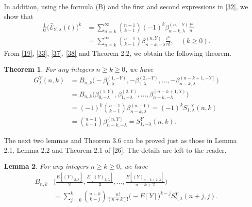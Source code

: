 \documentclass[a4paper,11pt]{amsart}
\newtheorem{theorem}{Theorem}[section]
\newtheorem{lemma}[theorem]{Lemma}
\begin{document}
In addition, using the formula (B) and the first and second expressions in \eqref{32}, we show that
\begin{equation} \label{38}
\begin{aligned}
\frac{1}{k!}\Big( \bar{\mathcal{E}}_{Y,\lambda}(t) \Big)^{k}&=\sum_{n=k}^{\infty}\binom{n-1}{k-1}(-1)^{k}\beta_{n-k,\lambda}^{(n,-Y)}\frac{t^{n}}{n!} \\
&=\sum_{n=k}^{\infty}\binom{n-1}{k-1}\beta_{n-k,-\lambda}^{(n,Y)}\frac{t^{n}}{n!},\quad (k \ge 0).
\end{aligned}
\end{equation}
From \eqref{19}, \eqref{33}, \eqref{37}, \eqref{38} and Theorem 2.2, we obtain the following theorem.
\begin{theorem}
For any integers $n \ge k \ge 0$, we have
\begin{align*}
G_{\lambda}^{Y}(n,k)&=B_{n,k}\big(-\beta_{0,\lambda}^{(1,-Y)},-\beta_{1,\lambda}^{(2,-Y)},\dots,-\beta_{n-k,\lambda}^{(n-k+1,-Y)}\big) \\
&=B_{n,k}\big(\beta_{0,-\lambda}^{(1,Y)},\beta_{1,-\lambda}^{(2,Y)},\dots,\beta_{n-k,-\lambda}^{(n-k+1,Y)}\big) \\
&=(-1)^{k}\binom{n-1}{k-1}\beta_{n-k,\lambda}^{(n,-Y)}=(-1)^{k}S_{1,\lambda}^{-Y}(n,k) \\
&=\binom{n-1}{k-1}\beta_{n-k,-\lambda}^{(n,Y)}=S_{1,-\lambda}^{Y}(n,k).
\end{align*}
\end{theorem}

The next two lemmas and Theorem 3.6 can be proved just as those in Lemma 2.1, Lemma 2.2 and Theorem 2.1 of [26]. The details are left to the reader.
\begin{lemma}
 For any integers $n \ge k \ge 0$, we have
\begin{align*}
B_{n,k}&\Big(\frac{E[(Y)_{2,\lambda}]}{2},\frac{E[(Y)_{3,\lambda}]}{3},\dots,\frac{E[(Y)_{n-k+2,\lambda}]}{n-k+2}\Big) \\
&=\sum_{j=0}^{k}\binom{n+k}{k-j}\frac{n!}{(n+k)!}\big(-E[Y]\big)^{k-j}S_{2,\lambda}^{Y}(n+j,j).
\end{align*}
\end{lemma}
\end{document}
